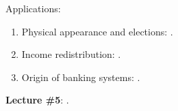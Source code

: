 \documentclass[letterpaper]{article}\usepackage[]{graphicx}\usepackage[svgnames]{xcolor}
\renewenvironment{itemize}{
  \begin{list}{}{
    \setlength{\leftmargin}{1.5em}
  }
}{
  \end{list}
}
\begin{document}
\begin{enumerate}
\begin{itemize}
\begin{enumerate}
          \end{enumerate}

       \item[$\diamond$] Applications:

           \begin{enumerate}


           \item[$\bullet$] Physical appearance and elections: \href{https://doi.org/10.1111/pops.12940}{}.


           \item[$\bullet$] Income redistribution: \href{https://doi.org/10.1111/j.1467-9221.2006.00509.x}{}.


          \item[$\bullet$] Origin of banking systems: \href{https://search.ebscohost.com/login.aspx?direct=true&db=nlebk&AN=516924&site=ehost-live&scope=site&ebv=EB&ppid=pp_88}{}.


         \end{enumerate}

     
      \end{itemize}

 \item {\bf Lecture \#5}:  {\color{ForestGreen}{\bf Field Experiments}}.



\end{enumerate}
\end{document}
